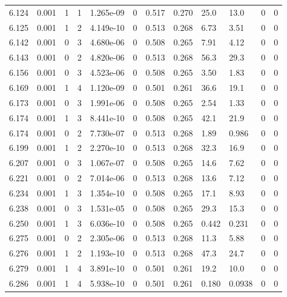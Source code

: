 \documentclass[preview]{standalone}
\begin{document}
{{{{{{{{{{{{{{{{{\begin{tabular}{L{1.2cm}C{1.2cm} C{0.3cm}C{0.5cm} C{1.4cm}C{1.4cm} C{1.4cm}C{1.4cm} C{1.6cm}C{1.6cm} C{1.6cm}C{1.6cm}}
  6.124  &  0.001  & 1     &  1 &  1.265e-09  & 0  &  0.517&   0.270& 25.0 & 13.0   &  0 & 0  \\ 
  6.125  &  0.001  & 1     &  2 &  4.149e-10  & 0  &  0.513&   0.268& 6.73 & 3.51   &  0 & 0  \\ 
  6.142  &  0.001  & 0     &  3 &  4.680e-06  & 0  &  0.508&   0.265& 7.91 & 4.12   &  0 & 0  \\ 
  6.143  &  0.001  & 0     &  2 &  4.820e-06  & 0  &  0.513&   0.268& 56.3 & 29.3   &  0 & 0  \\ 
  6.156  &  0.001  & 0     &  3 &  4.523e-06  & 0  &  0.508&   0.265& 3.50 & 1.83   &  0 & 0  \\ 
  6.169  &  0.001  & 1     &  4 &  1.120e-09  & 0  &  0.501&   0.261& 36.6 & 19.1   &  0 & 0  \\ 
  6.173  &  0.001  & 0     &  3 &  1.991e-06  & 0  &  0.508&   0.265& 2.54 & 1.33   &  0 & 0  \\ 
  6.174  &  0.001  & 1     &  3 &  8.441e-10  & 0  &  0.508&   0.265& 42.1 & 21.9   &  0 & 0  \\ 
  6.174  &  0.001  & 0     &  2 &  7.730e-07  & 0  &  0.513&   0.268& 1.89 & 0.986   &  0 & 0  \\ 
  6.199  &  0.001  & 1     &  2 &  2.270e-10  & 0  &  0.513&   0.268& 32.3 & 16.9   &  0 & 0  \\ 
  6.207  &  0.001  & 0     &  3 &  1.067e-07  & 0  &  0.508&   0.265& 14.6 & 7.62   &  0 & 0  \\ 
  6.221  &  0.001  & 0     &  2 &  7.014e-06  & 0  &  0.513&   0.268& 13.6 & 7.12   &  0 & 0  \\ 
  6.234  &  0.001  & 1     &  3 &  1.354e-10  & 0  &  0.508&   0.265& 17.1 & 8.93   &  0 & 0  \\ 
  6.238  &  0.001  & 0     &  3 &  1.531e-05  & 0  &  0.508&   0.265& 29.3 & 15.3   &  0 & 0  \\ 
  6.250  &  0.001  & 1     &  3 &  6.036e-10  & 0  &  0.508&   0.265& 0.442 & 0.231   &  0 & 0  \\ 
  6.275  &  0.001  & 0     &  2 &  2.305e-06  & 0  &  0.513&   0.268& 11.3 & 5.88   &  0 & 0  \\ 
  6.276  &  0.001  & 1     &  2 &  1.193e-10  & 0  &  0.513&   0.268& 47.3 & 24.7   &  0 & 0  \\ 
  6.279  &  0.001  & 1     &  4 &  3.891e-10  & 0  &  0.501&   0.261& 19.2 & 10.0   &  0 & 0  \\ 
  6.286  &  0.001  & 1     &  4 &  5.938e-10  & 0  &  0.501&   0.261& 0.180 & 0.0938   &  0 & 0  \\ 

\end{tabular}}}}}}}}}}}}}}}}}}
\end{document}
